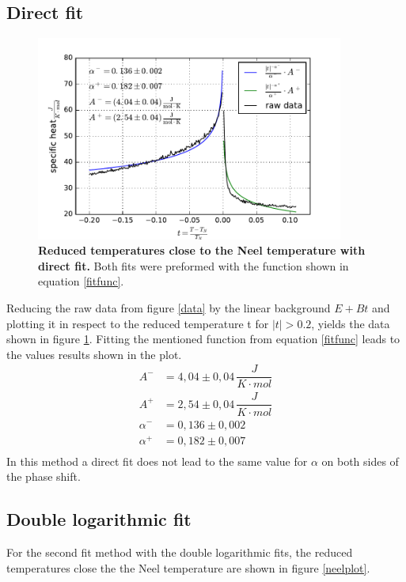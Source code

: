 \documentclass{include/thesisclass3}
\newcommand{\cc}{\cdot}
\newcommand{\e}[1]{\,\si{#1}}
\begin{document}
\subsection{Direct fit}
\begin{figure}[h]
\includegraphics[width = 0.9\textwidth]{fig/specheat_j.pdf}
\caption{\label{specH}\textbf{Reduced temperatures close to the Neel temperature with direct fit.} Both fits were preformed with the function shown in equation \ref{fitfunc}.}  
\end{figure}
Reducing the raw data from figure \ref{data} by the linear background $E + Bt$ and plotting it in respect to the reduced temperature t for $|t|> 0.2$, yields the data shown in figure \ref{specH}. Fitting the mentioned function from equation \ref{fitfunc} leads to the values results shown in the plot.
\begin{align*}
A^- &= 4,04 \pm 0,04 \e{\dfrac{J}{K\cc mol}}\\
A^+ &= 2,54 \pm 0,04 \e{\dfrac{J}{K\cc mol}}\\
\alpha^- &= 0,136 \pm 0,002\\
\alpha^+ &= 0,182 \pm 0,007\\
\end{align*}
In this method a direct fit does not lead to the same value for $\alpha$ on both sides of the phase shift.
\subsection{Double logarithmic fit}
For the second fit method with the double logarithmic fits, the reduced temperatures close the the Neel temperature are shown in figure \ref{neelplot}.
\end{document}

